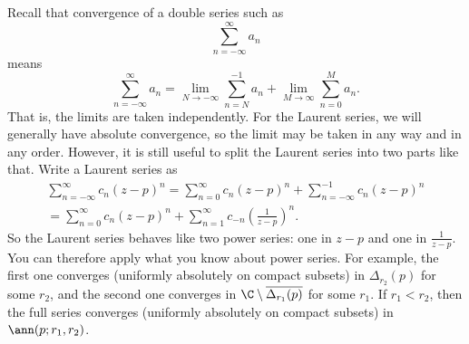 Recall that convergence of a double series such as
\begin{equation*}
\sum_{n=-\infty}^{\infty} a_n
\end{equation*}
means
\begin{equation*}
\sum_{n=-\infty}^{\infty} a_n
=
\lim_{N\to -\infty}
\sum_{n=N}^{-1} a_n
+
\lim_{M\to \infty}
\sum_{n=0}^{M} a_n .
\end{equation*}
That is, the limits are taken independently.
For the Laurent series,
we will generally have absolute convergence,
so the limit may be taken in any way
and in any order.
However, it is still useful to split the Laurent series into two
parts like that.
Write a Laurent series as 
\begin{multline*}
\sum_{n=-\infty}^{\infty} c_n {(z-p)}^n
=
\sum_{n=0}^{\infty} c_n {(z-p)}^n
+
\sum_{n=-\infty}^{-1} c_n {(z-p)}^n
\\
=
\sum_{n=0}^{\infty} c_n {(z-p)}^n
+
\sum_{n=1}^{\infty} c_{-n} {\left(\frac{1}{z-p}\right)}^n .
\end{multline*}
So the Laurent series behaves like two power series: one in $z-p$ and one
in $\frac{1}{z-p}$.  You can therefore apply what you know about power
series.  For example, the first one converges (uniformly absolutely on compact subsets) in $\Delta_{r_2}(p)$
for some $r_2$,
and the second one converges in $\C \setminus \overline{\Delta_{r_1}(p)}$
for some $r_1$.
If $r_1 < r_2$, then the full series converges
(uniformly absolutely on compact subsets)
in $\ann(p;r_1,r_2)$.

